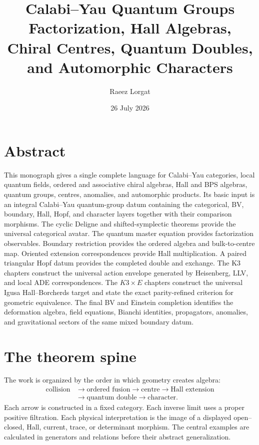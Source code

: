 \documentclass[11pt,twoside,openright]{memoir}
\title{\textbf{Calabi--Yau Quantum Groups}\\[0.55em]\Large Factorization, Hall Algebras, Chiral Centres, Quantum Doubles, and Automorphic Characters}
\author{Raeez Lorgat}
\date{26 July 2026}
\begin{document}
\frontmatter
\maketitle
\thispagestyle{empty}
\cleardoublepage
\chapter*{Abstract}

This monograph gives a single complete language for Calabi--Yau categories, local quantum fields, ordered and associative chiral algebras, Hall and BPS algebras, quantum groups, centres, anomalies, and automorphic products.  Its basic input is an integral Calabi--Yau quantum-group datum containing the categorical, BV, boundary, Hall, Hopf, and character layers together with their comparison morphisms.  The cyclic Deligne and shifted-symplectic theorems provide the universal categorical avatar.  The quantum master equation provides factorization observables.  Boundary restriction provides the ordered algebra and bulk-to-centre map.  Oriented extension correspondences provide Hall multiplication.  A paired triangular Hopf datum provides the completed double and exchange.  The K3 chapters construct the universal action envelope generated by Heisenberg, LLV, and local ADE correspondences.  The $K3\times E$ chapters construct the universal Igusa Hall--Borcherds target and state the exact parity-refined criterion for geometric equivalence.  The final BV and Einstein completion identifies the deformation algebra, field equations, Bianchi identities, propagators, anomalies, and gravitational sectors of the same mixed boundary datum.


\chapter*{The theorem spine}
The work is organized by the order in which geometry creates algebra:
\[
\begin{aligned}
\text{collision}&\longrightarrow\text{ordered fusion}\longrightarrow\text{centre}\longrightarrow\text{Hall extension}\\
&\longrightarrow\text{quantum double}\longrightarrow\text{character}.
\end{aligned}
\]
Each arrow is constructed in a fixed category.  Each inverse limit uses a proper positive filtration.  Each physical interpretation is the image of a displayed open--closed, Hall, current, trace, or determinant morphism.  The central examples are calculated in generators and relations before their abstract generalization.
\end{document}
